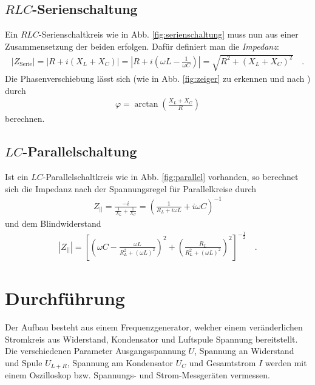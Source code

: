 \documentclass[12pt,a4paper,titlepage,headinclude,bibtotoc]{scrartcl}
\begin{document}
\subsection{$RLC$-Serienschaltung}
\label{sec:RLC}
Ein $RLC$-Serienschaltkreis wie in Abb. \ref{fig:serienschaltung} muss nun aus einer Zusammensetzung der beiden erfolgen.
Dafür definiert man die \emph{Impedanz}:
\begin{align}
|Z_\text{Serie}|=\left|R+i(X_L+X_C)\right|=\left|R+i\left( \omega L-\frac{1}{\omega C} \right)\right|=\sqrt{R^2+(X_L+X_C)^2}\quad .
\label{eq:ZSerie}
\end{align}
Die Phasenverschiebung lässt sich (wie in Abb. \ref{fig:zeiger} zu erkennen und nach \cite[S. 1042]{giancoli}) durch
\begin{align}
\varphi=\arctan\left( \frac{X_L+X_C}{R} \right)
\label{eq:PhaseSerie}
\end{align}
berechnen.

\subsection{$LC$-Parallelschaltung}
\label{sec:LC}
Ist ein $LC$-Parallelschaltkreis wie in Abb. \ref{fig:parallel} vorhanden, so berechnet sich die Impedanz nach der Spannungsregel für Parallelkreise durch
\begin{align}
Z_{||}=\frac{-i}{\frac{1}{X_L}+\frac{1}{X_C}}=\left( \frac{1}{R_L+i\omega L}+i\omega C \right)^{-1}
\end{align}
und dem Blindwiderstand
\begin{align}
|Z_{||}|=\left[\left(\omega C - \frac{\omega L}{R_L^2+(\omega L)^2}\right)^2+\left(\frac{R_L}{R_L^2+(\omega L)^2}\right)^2\right]^{-\frac{1}{2}}\label{eq:ZPara}\quad .
\end{align}
\section{Durchführung}
\label{sec:durchfuehrung}
Der Aufbau besteht aus einem Frequenzgenerator, welcher einem veränderlichen Stromkreis aus Widerstand, Kondensator und Luftspule Spannung bereitstellt.
Die verschiedenen Parameter Ausgangsspannung $U$, Spannung an Widerstand und Spule $U_{L+R}$, Spannung am Kondensator $U_C$ und Gesamtstrom $I$ werden mit einem Oszilloskop bzw. Spannungs- und Strom-Messgeräten vermessen.\\
\end{document}
